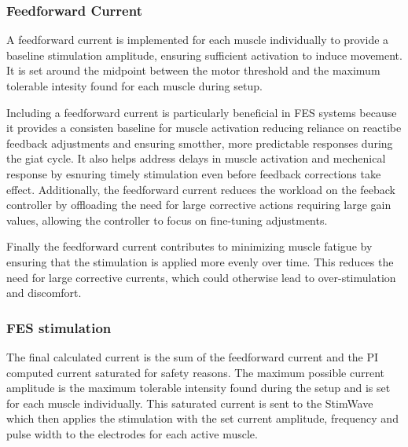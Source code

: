 \subsubsection{Feedforward Current}
A feedforward current is implemented for each muscle individually to provide a baseline stimulation amplitude, ensuring sufficient activation to induce movement. It is set around the midpoint between the motor threshold and the maximum tolerable intesity found for each muscle during setup. 

Including a feedforward current is particularly beneficial in FES systems because it provides a consisten baseline for muscle activation reducing reliance on reactibe feedback adjustments and ensuring smotther, more predictable responses during the giat cycle. It also helps address delays in muscle activation and mechenical response by esnuring timely stimulation even before feedback corrections take effect. Additionally, the feedforward current reduces the workload on the feeback controller by offloading the need for large corrective actions requiring large gain values, allowing the controller to focus on fine-tuning adjustments.

Finally the feedforward current contributes to minimizing muscle fatigue by ensuring that the stimulation is applied more evenly over time. This reduces the need for large corrective currents, which could otherwise lead to over-stimulation and discomfort.


\subsubsection{FES stimulation}
The final calculated current is the sum of the feedforward current and the PI computed current saturated for safety reasons. The maximum possible current amplitude is the maximum tolerable intensity found during the setup and is set for each muscle individually. This saturated current is sent to the StimWave which then applies the stimulation with the set current amplitude, frequency and pulse width to the electrodes for each active muscle.


























 





































